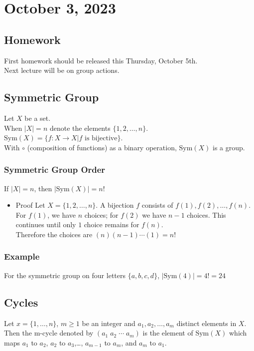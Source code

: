 \documentclass[11pt]{article}
\newcommand{\0}{\emptyset}
\begin{document}
\section*{October 3, 2023}
\label{sec:orgeca060c}
\subsection*{Homework}
\label{sec:orgdff9a4f}
First homework should be released this Thursday, October 5th.\\[0pt]
Next lecture will be on group actions.\\[0pt]
\subsection*{Symmetric Group}
\label{sec:org590bebe}
Let \(X\) be a set.\\[0pt]
When \(|X|=n\) denote the elements \(\{1,2,\ldots,n\}\).\\[0pt]
\(\text{Sym}(X)=\{f:X\to X|f\text{ is bijective}\}\).\\[0pt]
With \(\circ\) (composition of functions) as a binary operation, \(\text{Sym}(X)\) is a group.\\[0pt]
\subsubsection*{Symmetric Group Order}
\label{sec:org7562119}
If \(|X|=n\), then \(|\text{Sym}(X)|=n!\)\\[0pt]
\begin{itemize}
\item Proof
\label{sec:orgbf94cc4}
Let \(X=\{1,2,\ldots,n\}\). A bijection \(f\) consists of \(f(1),f(2),\ldots,f(n)\).\\[0pt]
For \(f(1)\), we have \(n\) choices; for \(f(2)\) we have \(n-1\) choices. This continues until only \(1\) choice remains for \(f(n)\).\\[0pt]
Therefore the choices are \((n)(n-1)\cdots(1)=n!\)\\[0pt]
\end{itemize}
\subsubsection*{Example}
\label{sec:orgce656e0}
For the symmetric group on four letters \(\{a,b,c,d\}\), \(|\text{Sym}(4)|=4!=24\)\\[0pt]
\subsection*{Cycles}
\label{sec:org198e332}
Let \(x=\{1,\ldots,n\}\), \(m\geq1\) be an integer and \(a_{1},a_{2},\ldots,a_{m}\) distinct elements in \(X\).\\[0pt]
Then the m-cycle denoted by \((a_{1}\;a_{2}\;\cdots\;a_{m})\) is the element of \(\text{Sym}(X)\) which maps \(a_{1}\) to \(a_{2}\), \(a_{2}\) to \(a_{3}\),\ldots{}, \(a_{m-1}\) to \(a_{m}\), and \(a_{m}\) to \(a_{1}\).\\[0pt]
\end{document}
